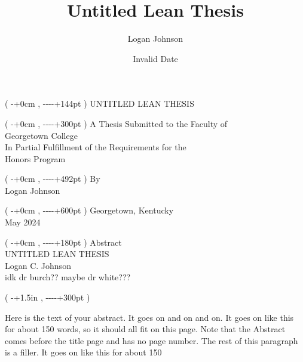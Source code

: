 \documentclass[
  letterpaper,
]{scrreprt}
\title{Untitled Lean Thesis}
\author{Logan Johnson}
\date{Invalid Date}
\theoremstyle{remark}
\begin{document}
\newcommand{\fromtop}[1]{%
  \dimexpr-1in-\topskip-\topmargin-\headheight-\headsep+#1\relax
}
\newcommand{\fromleft}[1]{%
  \dimexpr-1in-\oddsidemargin+#1\relax
}
\setlength{\textwidth}{6in}
\begin{titlepage}
\cleardoublepage
\thispagestyle{empty}
\begin{textblock*}{\paperwidth}(\fromleft{0cm},\fromtop{144pt})
\centering
UNTITLED LEAN THESIS
\end{textblock*}
\begin{textblock*}{\paperwidth}(\fromleft{0cm},\fromtop{300pt})
\centering
A Thesis Submitted to the Faculty of\\
\vspace{12pt}
Georgetown College\\
\vspace{12pt}
In Partial Fulfillment of the Requirements for the\\
\vspace{12pt}
Honors Program
\end{textblock*}
\begin{textblock*}{\paperwidth}(\fromleft{0cm},\fromtop{492pt})
\centering
By\\
\vspace{12pt}
Logan Johnson
\end{textblock*}
\begin{textblock*}{\paperwidth}(\fromleft{0cm},\fromtop{600pt})
\centering
Georgetown, Kentucky\\
\vspace{12pt}
May 2024
\end{textblock*}
\pagebreak
\thispagestyle{empty}
\begin{textblock*}{\paperwidth}(\fromleft{0cm},\fromtop{180pt})
\centering
Abstract\\
\vspace{12pt}
UNTITLED LEAN THESIS\\
\vspace{12pt}
Logan C. Johnson\\
\vspace{12pt}
idk dr burch?? maybe dr white???
\end{textblock*}
\begin{textblock*}{\textwidth}(\fromleft{1.5in},\fromtop{300pt})
\raggedright
Here is the text of your abstract. It goes on and on and on. It goes on like this for about
150 words, so it should all fit on this page. Note that the Abstract comes before the title page and
has no page number. The rest of this paragraph is a filler. It goes on like this for about 150

\end{textblock*}
\end{titlepage}
\end{document}
